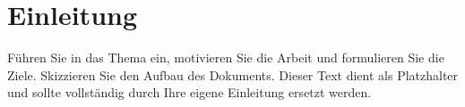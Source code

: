 \section{Einleitung}

Führen Sie in das Thema ein, motivieren Sie die Arbeit und formulieren Sie die
Ziele. Skizzieren Sie den Aufbau des Dokuments. Dieser Text dient als
Platzhalter und sollte vollständig durch Ihre eigene Einleitung ersetzt werden.
